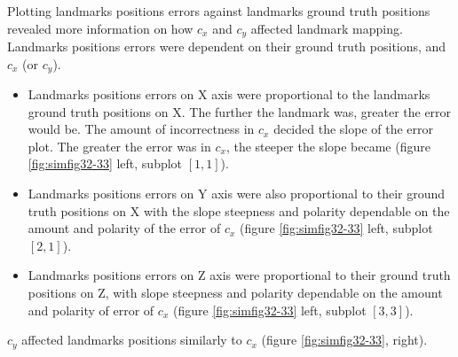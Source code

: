 Plotting landmarks positions errors against landmarks ground truth
positions revealed more information on how $c_{x}$ and $c_{y}$
affected landmark mapping. Landmarks positions errors were dependent
on their ground truth positions, and $c_{x}$ (or $c_{y}$).

\begin{itemize}
  \item Landmarks positions errors on X axis were proportional to the
  landmarks ground truth positions on X. The further the landmark was,
  greater the error would be. The amount of incorrectness in $c_{x}$
  decided the slope of the error plot. The greater the error was in
  $c_{x}$, the steeper the slope became (figure \ref{fig:simfig32-33} left,
  subplot $[1,1]$).
  \item Landmarks positions errors on Y axis were also proportional to
  their ground truth positions on X with the slope steepness and
  polarity dependable on the amount and polarity of the error of
  $c_{x}$ (figure \ref{fig:simfig32-33} left, subplot $[2,1]$).
  \item Landmarks positions errors on Z axis were proportional to
  their ground truth positions on Z, with slope steepness and polarity
  dependable on the amount and polarity of error of $c_{x}$ (figure
  \ref{fig:simfig32-33} left, subplot $[3,3]$).
\end{itemize}

$c_{y}$ affected landmarks positions similarly to $c_{x}$ (figure
\ref{fig:simfig32-33}, right).

